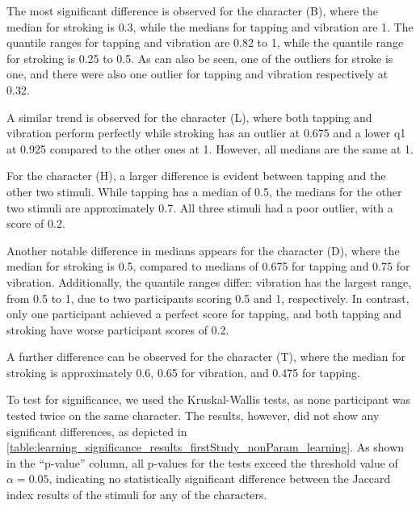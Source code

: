 The most significant difference is observed for the character (B), where the median for stroking is 0.3, while the medians for tapping and vibration are 1. The quantile ranges for tapping and vibration are 0.82 to 1, while the quantile range for stroking is 0.25 to 0.5.
As can also be seen, one of the outliers for stroke is one, and there were also one outlier for tapping and vibration respectively at 0.32.

A similar trend is observed for the character (L), where both tapping and vibration perform perfectly while stroking has an outlier at 0.675 and a lower q1 at 0.925 compared to the other ones at 1. However, all medians are the same at 1.

For the character (H), a larger difference is evident between tapping and the other two stimuli. While tapping has a median of 0.5, the medians for the other two stimuli are approximately 0.7. All three stimuli had a poor outlier, with a score of 0.2.

Another notable difference in medians appears for the character (D), where the median for stroking is 0.5, compared to medians of 0.675 for tapping and 0.75 for vibration. Additionally, the quantile ranges differ: vibration has the largest range, from 0.5 to 1, due to two participants scoring 0.5 and 1, respectively. In contrast, only one participant achieved a perfect score for tapping, and both tapping and stroking have worse participant scores of 0.2.

A further difference can be observed for the character (T), where the median for stroking is approximately 0.6, 0.65 for vibration, and 0.475 for tapping.

To test for significance, we used the Kruskal-Wallis tests, as none participant was tested twice on the same character. The results, however, did not show any significant differences, as depicted in \autoref{table:learning_significance_results_firstStudy_nonParam_learning}. 
As shown in the \enquote{p-value} column, all p-values for the tests exceed the threshold value of $\alpha = 0.05$, indicating no statistically significant difference between the Jaccard index results of the stimuli for any of the characters.


